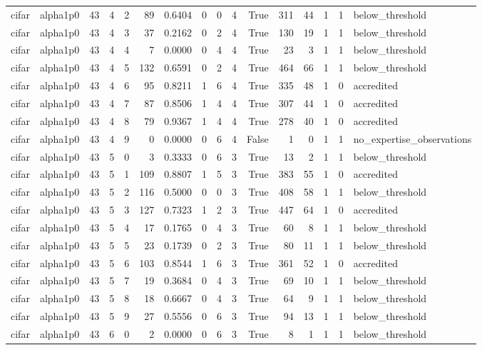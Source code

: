 \begin{tabular}{llrrrrrrrrrrrrrl}
cifar & alpha1p0 & 43 & 4 & 2 & 89 & 0.6404 & 0 & 0 & 4 & True & 311 & 44 & 1 & 1 & below\_threshold \\
cifar & alpha1p0 & 43 & 4 & 3 & 37 & 0.2162 & 0 & 2 & 4 & True & 130 & 19 & 1 & 1 & below\_threshold \\
cifar & alpha1p0 & 43 & 4 & 4 & 7 & 0.0000 & 0 & 4 & 4 & True & 23 & 3 & 1 & 1 & below\_threshold \\
cifar & alpha1p0 & 43 & 4 & 5 & 132 & 0.6591 & 0 & 2 & 4 & True & 464 & 66 & 1 & 1 & below\_threshold \\
cifar & alpha1p0 & 43 & 4 & 6 & 95 & 0.8211 & 1 & 6 & 4 & True & 335 & 48 & 1 & 0 & accredited \\
cifar & alpha1p0 & 43 & 4 & 7 & 87 & 0.8506 & 1 & 4 & 4 & True & 307 & 44 & 1 & 0 & accredited \\
cifar & alpha1p0 & 43 & 4 & 8 & 79 & 0.9367 & 1 & 4 & 4 & True & 278 & 40 & 1 & 0 & accredited \\
cifar & alpha1p0 & 43 & 4 & 9 & 0 & 0.0000 & 0 & 6 & 4 & False & 1 & 0 & 1 & 1 & no\_expertise\_observations \\
cifar & alpha1p0 & 43 & 5 & 0 & 3 & 0.3333 & 0 & 6 & 3 & True & 13 & 2 & 1 & 1 & below\_threshold \\
cifar & alpha1p0 & 43 & 5 & 1 & 109 & 0.8807 & 1 & 5 & 3 & True & 383 & 55 & 1 & 0 & accredited \\
cifar & alpha1p0 & 43 & 5 & 2 & 116 & 0.5000 & 0 & 0 & 3 & True & 408 & 58 & 1 & 1 & below\_threshold \\
cifar & alpha1p0 & 43 & 5 & 3 & 127 & 0.7323 & 1 & 2 & 3 & True & 447 & 64 & 1 & 0 & accredited \\
cifar & alpha1p0 & 43 & 5 & 4 & 17 & 0.1765 & 0 & 4 & 3 & True & 60 & 8 & 1 & 1 & below\_threshold \\
cifar & alpha1p0 & 43 & 5 & 5 & 23 & 0.1739 & 0 & 2 & 3 & True & 80 & 11 & 1 & 1 & below\_threshold \\
cifar & alpha1p0 & 43 & 5 & 6 & 103 & 0.8544 & 1 & 6 & 3 & True & 361 & 52 & 1 & 0 & accredited \\
cifar & alpha1p0 & 43 & 5 & 7 & 19 & 0.3684 & 0 & 4 & 3 & True & 69 & 10 & 1 & 1 & below\_threshold \\
cifar & alpha1p0 & 43 & 5 & 8 & 18 & 0.6667 & 0 & 4 & 3 & True & 64 & 9 & 1 & 1 & below\_threshold \\
cifar & alpha1p0 & 43 & 5 & 9 & 27 & 0.5556 & 0 & 6 & 3 & True & 94 & 13 & 1 & 1 & below\_threshold \\
cifar & alpha1p0 & 43 & 6 & 0 & 2 & 0.0000 & 0 & 6 & 3 & True & 8 & 1 & 1 & 1 & below\_threshold \\

\end{tabular}
